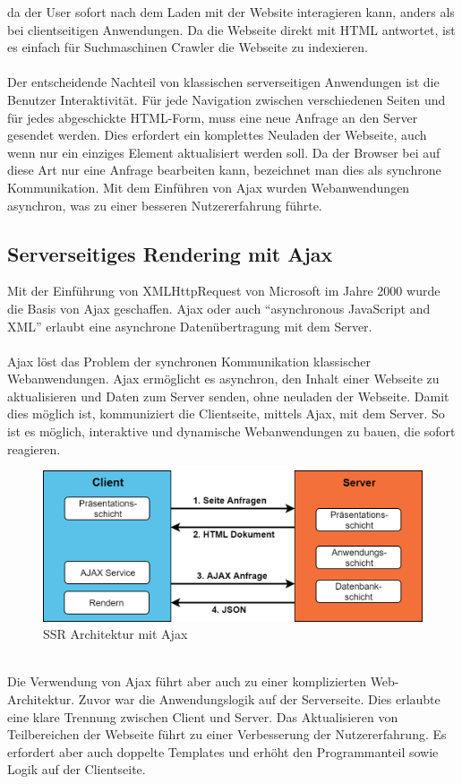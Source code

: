 \documentclass[runningheads]{llncs}
\numberwithin{figure}{section}
\begin{document}
da der User sofort nach dem Laden mit der Website interagieren kann, 
anders als bei clientseitigen Anwendungen. 
Da die Webseite direkt mit HTML antwortet, ist es einfach für Suchmaschinen Crawler 
die Webseite zu indexieren. 
\\
\\
Der entscheidende Nachteil von klassischen serverseitigen Anwendungen 
ist die Benutzer Interaktivität. Für jede Navigation zwischen verschiedenen 
Seiten und für jedes abgeschickte HTML-Form, 
muss eine neue Anfrage an den Server gesendet werden. 
Dies erfordert ein komplettes Neuladen der Webseite, 
auch wenn nur ein einziges Element aktualisiert werden soll. 
Da der Browser bei auf diese Art nur eine Anfrage bearbeiten kann, 
bezeichnet man dies als synchrone Kommunikation. 
Mit dem Einführen von Ajax wurden Webanwendungen asynchron, 
was zu einer besseren Nutzererfahrung führte.

\subsection{Serverseitiges Rendering mit Ajax}
\label{subsec:Serverseitiges Rendering mit Ajax}
Mit der Einführung von XMLHttpRequest von Microsoft im Jahre 2000 wurde die Basis von Ajax geschaffen. 
Ajax oder auch “asynchronous JavaScript and XML” erlaubt eine asynchrone Datenübertragung mit dem Server.
\\
\\
Ajax löst das Problem der synchronen Kommunikation klassischer Webanwendungen. 
Ajax ermöglicht es asynchron, 
den Inhalt einer Webseite zu aktualisieren und Daten zum Server senden, 
ohne neuladen der Webseite. Damit dies möglich ist, 
kommuniziert die Clientseite, mittels Ajax, mit dem Server. 
So ist es möglich, interaktive und dynamische Webanwendungen zu bauen, 
die sofort reagieren. \cite{IsomorphicApps}
\begin{figure}[h]
  \centering
  \includegraphics[width=12cm]{images/serverajax}
  \caption{SSR Architektur mit Ajax}
  \label{SSR Architektur mit Ajax}
\end{figure}
\\
Die Verwendung von Ajax führt aber auch zu einer komplizierten Web-Architektur. 
Zuvor war die Anwendungslogik auf der Serverseite. 
Dies erlaubte eine klare Trennung zwischen Client und Server. 
Das Aktualisieren von Teilbereichen der Webseite führt 
zu einer Verbesserung der Nutzererfahrung. 
Es erfordert aber auch doppelte Templates und erhöht den Programmanteil sowie Logik auf der Clientseite.
\end{document}
